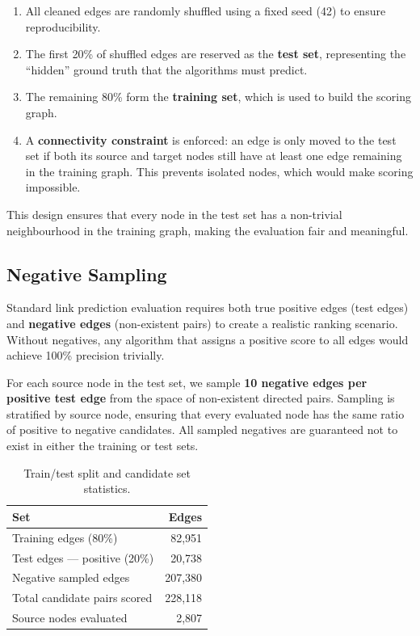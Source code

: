 \documentclass[10pt]{article}
\newcommand{\theadfont}{\bfseries\color{white}}
\begin{document}
\begin{enumerate}
  \item All cleaned edges are randomly shuffled using a fixed seed (42) to ensure reproducibility.
  \item The first 20\% of shuffled edges are reserved as the \textbf{test set}, representing the ``hidden'' ground truth that the algorithms must predict.
  \item The remaining 80\% form the \textbf{training set}, which is used to build the scoring graph.
  \item A \textbf{connectivity constraint} is enforced: an edge is only moved to the test set if both its source and target nodes still have at least one edge remaining in the training graph. This prevents isolated nodes, which would make scoring impossible.
\end{enumerate}

This design ensures that every node in the test set has a non-trivial neighbourhood in the training graph, making the evaluation fair and meaningful.

\subsection{Negative Sampling}

Standard link prediction evaluation requires both true positive edges (test edges) and \textbf{negative edges} (non-existent pairs) to create a realistic ranking scenario. Without negatives, any algorithm that assigns a positive score to all edges would achieve 100\% precision trivially.

For each source node in the test set, we sample \textbf{10 negative edges per positive test edge} from the space of non-existent directed pairs. Sampling is stratified by source node, ensuring that every evaluated node has the same ratio of positive to negative candidates. All sampled negatives are guaranteed not to exist in either the training or test sets.

\begin{table}[H]
  \centering
  \caption{Train/test split and candidate set statistics.}
  \label{tab:split}
  \begin{tabular}{lr}
    \hline
    \rowcolor{brandblue}
    \theadfont Set & \theadfont Edges \\
    \hline
    \rowcolor{lightblue}
    Training edges (80\%)          & 82,951 \\
    Test edges --- positive (20\%) & 20,738 \\
    \rowcolor{lightblue}
    Negative sampled edges         & 207,380 \\
    \hline
    Total candidate pairs scored   & 228,118 \\
    \rowcolor{lightblue}
    Source nodes evaluated         & 2,807 \\
    \hline
  \end{tabular}
\end{table}
\end{document}
